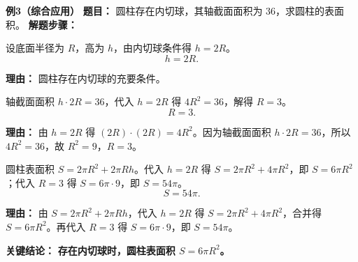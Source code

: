 \begin{examplebox}
	\medskip
	\textbf{\textcolor{CExample}{例3（综合应用）}}
	\textbf{\textcolor{CExample}{题目：}}
	圆柱存在内切球，其轴截面面积为 $36$，求圆柱的表面积。
	\textbf{\textcolor{CExample}{解题步骤：}}
	\begin{description}[style=nextline, leftmargin=2.8em, labelsep=0.5em, itemsep=0.45em]
		\item[\textbf{第一步（内切球条件）：}]
			设底面半径为 $R$，高为 $h$，由内切球条件得 $h=2R$。
			\[
				h = 2R.
			\]
			\par\textbf{理由：} 圆柱存在内切球的充要条件。
		\item[\textbf{第二步（利用轴截面面积）：}]
			轴截面面积 $h \cdot 2R = 36$，代入 $h=2R$ 得 $4R^{2}=36$，解得 $R=3$。
			\[
				R = 3.
			\]
			\par\textbf{理由：} 由 $h=2R$ 得 $(2R)\cdot(2R)=4R^{2}$。因为轴截面面积 $h\cdot2R=36$，所以 $4R^{2}=36$，故 $R^{2}=9$，$R=3$。
		\item[\textbf{第三步（求表面积）：}]
			圆柱表面积 $S = 2\pi R^{2} + 2\pi R h$。代入 $h=2R$ 得 $S = 2\pi R^{2} + 4\pi R^{2}$，即 $S = 6\pi R^{2}$；代入 $R=3$ 得 $S = 6\pi \cdot 9$，即 $S = 54\pi$。
			\[
				S = 54\pi.
			\]
			\par\textbf{理由：} 由 $S = 2\pi R^{2} + 2\pi R h$，代入 $h=2R$ 得 $S = 2\pi R^{2} + 4\pi R^{2}$，合并得 $S=6\pi R^{2}$。再代入 $R=3$ 得 $S = 6\pi \cdot 9$，即 $S = 54\pi$。
	\end{description}
	\textbf{\textcolor{CExample}{关键结论：}}
	\textbf{存在内切球时，圆柱表面积 $S=6\pi R^{2}$。}
\end{examplebox}
